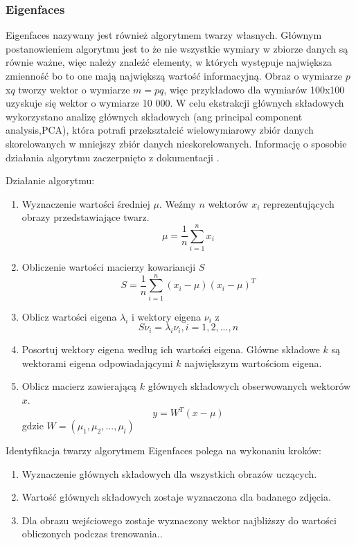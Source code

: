 \subsubsection{Eigenfaces} \label{s:eigen}
Eigenfaces nazywany jest również algorytmem twarzy własnych. Głównym postanowieniem algorytmu jest to że nie wszystkie wymiary w zbiorze danych są równie ważne, więc należy znaleźć elementy, w których występuje największa zmienność bo to one mają największą wartość informacyjną. Obraz o wymiarze $p$x$q$ tworzy wektor o wymiarze $m=pq$, więc przykładowo dla wymiarów 100x100 uzyskuje się wektor o wymiarze 10 000. W celu ekstrakcji głównych składowych wykorzystano analizę głównych składowych (ang principal component analysis,PCA), która potrafi przekształcić wielowymiarowy zbiór danych skorelowanych w mniejszy zbiór danych nieskorelowanych. Informację o sposobie działania algorytmu zaczerpnięto z dokumentacji \cite{opencv_doc}.

Działanie algorytmu:
\begin{enumerate}
\item Wyznaczenie wartości średniej $\mu$. Weźmy $n$ wektorów $x_{i}$ reprezentujących obrazy przedstawiające twarz.
\begin{equation}
\mu=\frac{1}{n}\sum_{i=1}^{n}x_{i}
\end{equation}
\item Obliczenie wartości macierzy kowariancji $S$
\begin{equation}
S=\frac{1}{n}\sum^{n}_{i=1}(x_{i}-\mu)(x_{i}-\mu)^{T}
\end{equation}
\item Oblicz wartości eigena $\lambda_{i}$ i wektory eigena $\nu_{i}$ z \begin{equation}
S\nu_{i}=\lambda_{i}\nu_{i},i=1,2,...,n
\end{equation}
\item Posortuj wektory eigena według ich wartości eigena. Główne składowe $k$ są wektorami eigena odpowiadającymi $k$ największym wartościom eigena.
\item Oblicz macierz zawierającą $k$ głównych składowych obserwowanych wektorów $x$.
\begin{equation}
y=W^{T}(x-\mu)
\end{equation}
gdzie $W=(\mu_{1},\mu_{2},...,\mu_{l})$
\end{enumerate}

Identyfikacja twarzy algorytmem Eigenfaces polega na wykonaniu kroków:
\begin{enumerate}
\item Wyznaczenie głównych składowych dla wszystkich obrazów uczących.
\item Wartość głównych składowych zostaje wyznaczona dla badanego zdjęcia.
\item Dla obrazu wejściowego zostaje wyznaczony wektor najbliższy do wartości obliczonych podczas trenowania..
\end{enumerate}

